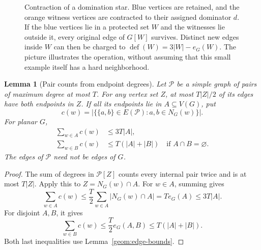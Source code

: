 \documentclass[11pt,a4paper]{article}
\newtheorem{lemma}[lemma]{Lemma}
\theoremstyle{definition}
\theoremstyle{remark}
\DeclareMathOperator{\Def}{def}
\begin{document}
\begin{figure}[tbp]
\centering
{}
\caption{Contraction of a domination star. Blue vertices are retained,
and the orange witness vertices are contracted to their assigned
dominator \(d\). If the blue vertices lie in a protected set \(W\)
and the witnesses lie outside it, every original edge of \(G[W]\)
survives. Distinct new edges inside \(W\) can then be charged to
\(\Def(W)=3|W|-e_G(W)\). The picture illustrates the operation, without
assuming that this small example itself has a hard neighborhood.}
\label{fig:contraction}
\end{figure}

\begin{lemma}[Pair counts from endpoint degrees]\label{geom:pair-degree}
Let $\mathcal P$ be a simple graph of pairs of maximum degree at most
$T$. For any vertex set $Z$, at most $T|Z|/2$ of its edges have both
endpoints in $Z$. If all its endpoints lie in $A\subseteq V(G)$, put
\[
 c(w)=|\{\{a,b\}\in E(\mathcal P):a,b\in N_G(w)\}|.
\]
For planar $G$,
\begin{align}
 \sum_{w\in A}c(w)&\leq3T|A|,\label{geom:pairs-inside}\\
 \sum_{w\in B}c(w)&\leq T(|A|+|B|)
       \quad\text{if }A\cap B=\varnothing.\label{geom:pairs-bipartite}
\end{align}
The edges of $\mathcal P$ need not be edges of $G$.
\end{lemma}
\begin{proof}
The sum of degrees in $\mathcal P[Z]$ counts every internal pair twice
and is at most $T|Z|$. Apply this to $Z=N_G(w)\cap A$. For $w\in A$,
summing gives
\[
 \sum_{w\in A}c(w)
 \leq\frac T2\sum_{w\in A}|N_G(w)\cap A|
 =T e_G(A)\leq3T|A|.
\]
For disjoint $A,B$, it gives
\[
 \sum_{w\in B}c(w)
 \leq\frac T2 e_G(A,B)\leq T(|A|+|B|).
\]
Both last inequalities use Lemma~\ref{geom:edge-bounds}.
\end{proof}
\end{document}
